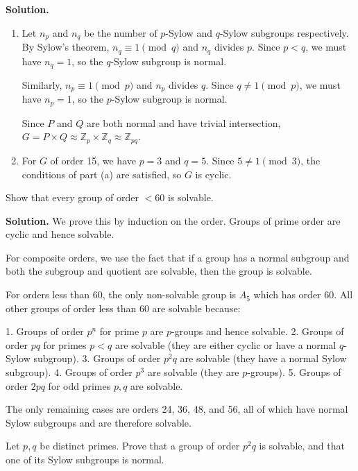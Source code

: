 \noindent\textbf{Solution.}
\begin{enumerate}[label=(\alph*)]
\item Let $n_p$ and $n_q$ be the number of $p$-Sylow and $q$-Sylow subgroups respectively. By Sylow's theorem, $n_q \equiv 1 \pmod{q}$ and $n_q$ divides $p$. Since $p < q$, we must have $n_q = 1$, so the $q$-Sylow subgroup is normal.

Similarly, $n_p \equiv 1 \pmod{p}$ and $n_p$ divides $q$. Since $q \neq 1 \pmod{p}$, we must have $n_p = 1$, so the $p$-Sylow subgroup is normal.

Since $P$ and $Q$ are both normal and have trivial intersection, $G = P \times Q \approx \mathbb{Z}_p \times \mathbb{Z}_q \approx \mathbb{Z}_{pq}$.

\item For $G$ of order 15, we have $p = 3$ and $q = 5$. Since $5 \neq 1 \pmod{3}$, the conditions of part (a) are satisfied, so $G$ is cyclic.
\end{enumerate}

\begin{problembox}
Show that every group of order $< 60$ is solvable.
\end{problembox}

\noindent\textbf{Solution.} We prove this by induction on the order. Groups of prime order are cyclic and hence solvable.

For composite orders, we use the fact that if a group has a normal subgroup and both the subgroup and quotient are solvable, then the group is solvable.

For orders less than 60, the only non-solvable group is $A_5$ which has order 60. All other groups of order less than 60 are solvable because:

1. Groups of order $p^n$ for prime $p$ are $p$-groups and hence solvable.
2. Groups of order $pq$ for primes $p < q$ are solvable (they are either cyclic or have a normal $q$-Sylow subgroup).
3. Groups of order $p^2q$ are solvable (they have a normal Sylow subgroup).
4. Groups of order $p^3$ are solvable (they are $p$-groups).
5. Groups of order $2pq$ for odd primes $p, q$ are solvable.

The only remaining cases are orders 24, 36, 48, and 56, all of which have normal Sylow subgroups and are therefore solvable.

\begin{problembox}
Let $p, q$ be distinct primes. Prove that a group of order $p^2q$ is solvable, and that one of its Sylow subgroups is normal.
\end{problembox}

